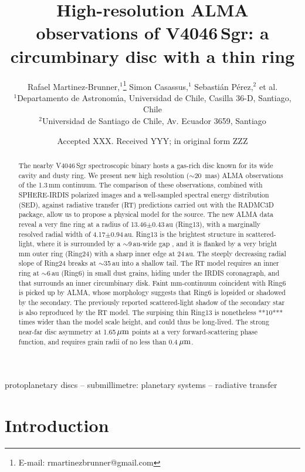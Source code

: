 \documentclass[letters,usenatbib,times]{mnras}
\title[High-resolution ALMA observations of V4046\,Sgr]{High-resolution ALMA observations of V4046\,Sgr: a circumbinary disc with a thin ring}
\author[R. Martinez Brunner et al.]{
Rafael Martinez-Brunner,$^{1}$\thanks{E-mail: rmartinezbrunner@gmail.com}
Simon Casassus,$^{1}$
Sebasti\'an P\'erez,$^{2}$
et al. 
\\
$^{1}$Departamento de Astronom\'{\i}a, Universidad de Chile, Casilla 36-D, Santiago, Chile\\
$^{2}$Universidad de Santiago de Chile, Av. Ecuador 3659, Santiago\\
}
\date{Accepted XXX. Received YYY; in original form ZZZ}
\begin{document}
\label{firstpage}
\pagerange{\pageref{firstpage}--\pageref{lastpage}}
\maketitle

\begin{abstract}
  The nearby V4046\,Sgr spectroscopic binary  hosts a gas-rich disc known for its wide cavity and dusty ring. We present new high resolution ($\sim$20\, mas) ALMA observations of the 1.3\,mm  continuum. The comparison of these  observations, combined with SPHERE-IRDIS polarized  images and a well-sampled spectral energy distribution (SED), against radiative transfer (RT) predictions carried out with the RADMC3D package, allow us to propose a physical model for the source. The new ALMA data reveal a very fine ring at a radius of 13.46$\pm$0.43\,au (Ring13), with a marginally resolved radial width of  4.17$\pm$0.94\,au.  Ring13 is the brightest structure in scattered-light, where it is surrounded by a $\sim$9\,au-wide gap , and it is flanked by a very bright mm outer ring (Ring24) with a sharp inner edge at 24\,au. The steeply decreasing radial slope of Ring24 breaks at $\sim$35\,au into a shallow tail. The RT model requires an inner ring at $\sim$6\,au (Ring6) in small dust grains, hiding under the IRDIS coronagraph, and that surrounds an inner circumbinary disk. Faint mm-continuum coincident with Ring6 is picked up by ALMA, whose morphology  suggests that Ring6  is lopsided or shadowed by the secondary. The previously reported scattered-light shadow of the secondary star is  also reproduced by the RT model.  The surpising  thin Ring13 is nonetheless **10*** times wider than the model scale height, and could thus be long-lived.   The strong near-far disc asymmetry  at 1.65\,$\hbox{$\mu$m}$ points at a very forward-scattering phase function, and requires  grain radii  of no less than  0.4\,$\hbox{$\mu$m}$. 
\end{abstract}

\begin{keywords}
 protoplanetary discs -- submillimetre: planetary systems -- radiative transfer
\end{keywords}




\section{Introduction} \label{sec:Introduction}
\end{document}
